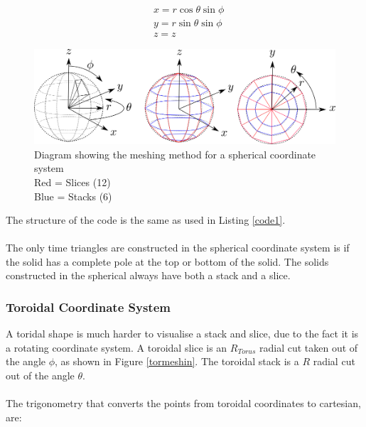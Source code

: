 \documentclass[12pt,a4paper]{article}
\begin{document}
\begin{equation}
\begin{aligned}
& x = r \cos{\theta}\sin{\phi}\\
& y = r \sin{\theta}\sin{\phi} \\
& z = z
\end{aligned}
\label{trigsph}
\end{equation}
\begin{figure}[h!]
\centering
\includegraphics[scale=0.5]{Images//Coords//sph.png}
\caption[width=\columnwidth]{Diagram showing the meshing method for a spherical coordinate system\\
Red = Slices (12)\\
Blue = Stacks (6)}
\label{sphmeshin}
\end{figure}

\noindent The structure of the code is the same as used in Listing \ref{code1}.\\\\
\noindent The only time triangles are constructed in the spherical coordinate system is if the solid has a complete pole at the top or bottom of the solid. The solids constructed in the spherical always have both a stack and a slice.

%

\newpage
\subsubsection{Toroidal Coordinate System}

A toridal shape is much harder to visualise a stack and slice, due to the fact it is a rotating coordinate system. A toroidal slice is an $R_{Torus}$ radial cut taken out of the angle $\phi$, as shown in Figure \ref{tormeshin}. The toroidal stack is a $R$ radial cut out of the angle $\theta$. 
\\\\
The trigonometry that converts the points from toroidal coordinates to cartesian, are:
\end{document}
